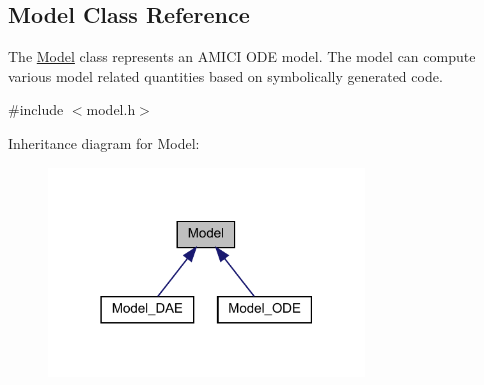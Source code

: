 \hypertarget{classamici_1_1_model}{}\subsection{Model Class Reference}
\label{classamici_1_1_model}


The \mbox{\hyperlink{classamici_1_1_model}{Model}} class represents an A\+M\+I\+CI O\+DE model. The model can compute various model related quantities based on symbolically generated code.  




{\ttfamily \#include $<$model.\+h$>$}



Inheritance diagram for Model\+:
\nopagebreak
\begin{figure}[H]
\begin{center}
\leavevmode
\includegraphics[width=238pt]{classamici_1_1_model__inherit__graph}
\end{center}
\end{figure}
